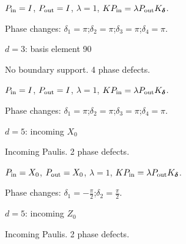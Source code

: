 \vspace{-1mm}
$P_{\rm in}=I$, \quad $P_{\rm out}=I$, \quad $\lambda=1$, \qquad $K P_{\rm in}=\lambda P_{\rm out}K_{\boldsymbol\delta}$.
\par\smallskip\begin{minipage}{.98\linewidth}\small Phase changes: $\delta_{1}=\pi$;\quad $\delta_{2}=\pi$;\quad $\delta_{3}=\pi$;\quad $\delta_{4}=\pi$.\end{minipage}
\vfill
{\footnotesize\texttt{}}
\newpage
{}
{\Large $d=3$: basis element 90}\par
No boundary support. 4 phase defects.
\begin{center}
\end{center}
\vspace{-1mm}
$P_{\rm in}=I$, \quad $P_{\rm out}=I$, \quad $\lambda=1$, \qquad $K P_{\rm in}=\lambda P_{\rm out}K_{\boldsymbol\delta}$.
\par\smallskip\begin{minipage}{.98\linewidth}\small Phase changes: $\delta_{1}=\pi$;\quad $\delta_{2}=\pi$;\quad $\delta_{3}=\pi$;\quad $\delta_{4}=\pi$.\end{minipage}
\vfill
{\footnotesize\texttt{}}
\newpage
{}
{\Large $d=5$: incoming $X_{0}$}\par
Incoming Paulis. 2 phase defects.
\begin{center}
\end{center}
\vspace{-1mm}
$P_{\rm in}=X_{0}$, \quad $P_{\rm out}=X_{0}$, \quad $\lambda=1$, \qquad $K P_{\rm in}=\lambda P_{\rm out}K_{\boldsymbol\delta}$.
\par\smallskip\begin{minipage}{.98\linewidth}\small Phase changes: $\delta_{1}=-\frac{\pi}{2}$;\quad $\delta_{2}=\frac{\pi}{2}$.\end{minipage}
\vfill
{\footnotesize\texttt{}}
\newpage
{}
{\Large $d=5$: incoming $Z_{0}$}\par
Incoming Paulis. 2 phase defects.
\begin{center}
\end{center}
\vspace{-1mm}
